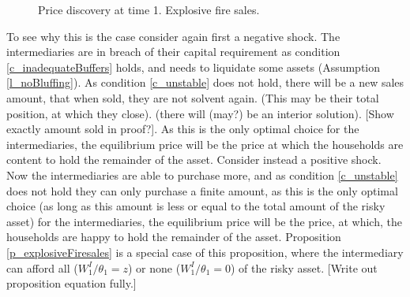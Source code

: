 \documentclass[11pt]{article}
\begin{document}
\begin{figure}[h]
\centering
{}
\caption{Price discovery at time 1. Explosive fire sales.}
\label{fig:t1explosiveFS}
\end{figure}

To see why this is the case consider again first a negative shock. The intermediaries are in breach of their capital requirement as condition \ref{c_inadequateBuffers} holds, and needs to liquidate some assets (Assumption \ref{l_noBluffing}). As condition \ref{c_unstable} does not hold, there will be a new sales amount, that when sold, they are not solvent again. (This may be their total position, at which they close). (there will (may?) be an interior solution). [Show exactly amount sold in proof?]. As this is the only optimal choice for the intermediaries, the equilibrium price will be the price at which the households are content to hold the remainder of the asset. Consider instead a positive shock. Now the intermediaries are able to purchase more, and as condition \ref{c_unstable} does not hold they can only purchase a finite amount, as this is the only optimal choice (as long as this amount is less or equal to the total amount of the risky asset) for the intermediaries, the equilibrium price will be the price, at which, the households are happy to hold the remainder of the asset. Proposition \ref{p_explosiveFiresales} is a special case of this proposition, where the intermediary can afford all ($W^I_1/\theta_1 = z$) or none ($W^I_1/\theta_1 = 0$) of the risky asset. [Write out proposition equation fully.]
\end{document}
